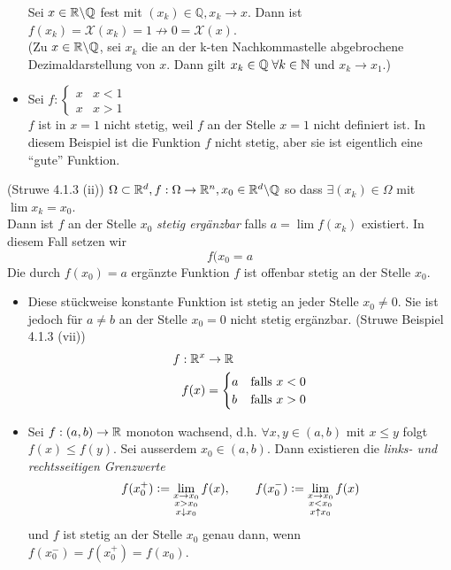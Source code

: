 \begin{itemize}
Sei $x\in\mathbb{R}\backslash\mathbb{Q}$ fest mit $(x_{k})\in\mathbb{Q}, x_{k}\to x$. Dann ist ${f(x_{k})=\mathcal{X}(x_{k})=1 \nrightarrow 0=\mathcal{X}(x)}$. \\
(Zu $x\in\mathbb{R}\backslash\mathbb{Q}$, sei $x_{k}$ die an der k-ten Nachkommastelle abgebrochene Dezimaldarstellung von $x$. Dann gilt $x_{k} \in \mathbb{Q}\; \forall k \in \mathbb{N}$ und $x_{k}\to x_{1}$.)
\item Sei $f: \begin{cases} x &x < 1 \\x &x>1 \end{cases}$ \\

 $f$ ist in $x=1$ nicht stetig, weil $f$ an der Stelle $x=1$ nicht definiert ist. In diesem Beispiel ist die Funktion $f$ nicht stetig, aber sie ist eigentlich eine ``gute'' Funktion.

\end{itemize}
\begin{definition}{(Struwe 4.1.3 (ii))}
$\Omega \subset \mathbb{R}^{d}, f:\Omega\to\mathbb{R}^{n}, x_{0}\in\mathbb{R}^{d}\backslash\mathbb{Q}$ so dass $\exists (x_{k})\in\Omega$ mit $\lim{x_{k}=x_{0}}$. \\

Dann ist $f$ an der Stelle $x_{0}$ \emph{stetig ergänzbar} falls $a=\lim{f(x_{k})}$ existiert. In diesem Fall setzen wir \[ f(x_{0} = a\]
Die durch $f(x_{0})=a$ ergänzte Funktion $f$ ist offenbar stetig an der Stelle $x_{0}$.
\end{definition}

\begin{itemize}
\item Diese stückweise konstante Funktion ist stetig an jeder Stelle $x_{0} \neq 0$. Sie ist jedoch für $a\neq b$ an der Stelle $x_{0}=0$ nicht stetig ergänzbar. (Struwe Beispiel 4.1.3 (vii))
\begin{align*}f:\mathbb{R}^{x}&\to\mathbb{R} \\ f(x)&=\begin{cases}a &\text{falls } x<0 \\ b &\text{falls } x>0\end{cases} \end{align*}
\item Sei $f:(a,b)\to\mathbb{R}$ monoton wachsend, d.h. $\forall x,y\in(a,b)$ mit $x\leq y$ folgt $f(x)\leq f(y)$. Sei ausserdem $x_{0}\in (a,b)$. Dann existieren die \emph{links- und rechtsseitigen Grenzwerte} 
\[ f(x_{0}^{+}) \vcentcolon= \lim_{\substack{x\to x_{0} \\ x > x_{0} \\ x \downarrow x_{0}}}f(x), \quad\quad f(x_{0}^{-})\vcentcolon= \lim_{\substack{x\to x_{0} \\ x < x_{0} \\ x \uparrow x_{0}}}f(x) \]
und $f$ ist stetig an der Stelle $x_{0}$ genau dann, wenn $f(x_{0}^{-})=f(x_{0}^{+})=f(x_{0})$.
\end{itemize}
